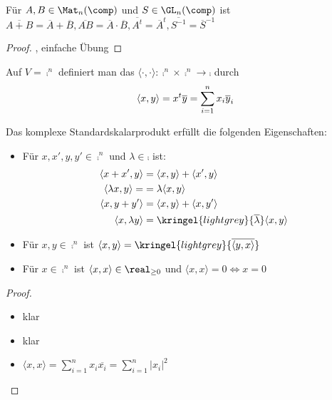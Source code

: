 \begin{conclusion}
	Für $A,B\in\Mat_n(\comp)$ und $S\in\GL_n(\comp)$ ist $\overline{A+B}=\overline{A}+\overline{B}, \overline{AB}=\overline{A}\cdot \overline{B},\overline{A^t}=\overline{A}^t, \overline{S^{-1}}=\overline{S}^{-1}$
\end{conclusion}
\begin{proof}
	, einfache Übung
\end{proof}

\begin{definition}
	Auf $V=\comp^n$ definiert man das  $\langle\cdot,\cdot\rangle:\comp^n\times\comp^n\to \comp$ durch
	\begin{align}
	\langle x,y\rangle=x^t\overline{y}=\sum_{i=1}^n x_i\overline{y}_i\notag
	\end{align}
\end{definition}

\begin{proposition}
	Das komplexe Standardskalarprodukt erfüllt die folgenden Eigenschaften:
	\begin{itemize}
		\item Für $x,x',y,y'\in\comp^n$ und $\lambda\in\comp$ ist:
		\begin{align}
		\langle x+x',y\rangle &= \langle x,y\rangle + \langle x',y\rangle\notag\\
		\langle \lambda x,y\rangle =&= \lambda \langle x,y \rangle\notag \\
		\langle x,y+y' \rangle &= \langle x,y \rangle + \langle x,y'\rangle\notag \\
		\langle x,\lambda y \rangle &= \kringel{lightgrey}{\overline{\lambda}} \langle x,y \rangle\notag
		\end{align}
		\item Für $x,y\in\comp^n$ ist $\langle x,y \rangle=\kringel{lightgrey}{\overline{\langle y,x\rangle}}$
		\item Für $x\in\comp^n$ ist $\langle x,x \rangle\in\real_{\ge 0}$ und $\langle x,x\rangle=0\iff x=0$
	\end{itemize}
\end{proposition}
\begin{proof}
	\begin{itemize}
		\item klar
		\item klar
		\item $\langle x,x\rangle=\sum_{i=1}^n x_i\overline{x_i}=\sum_{i=1}^n \vert x_i\vert^2$
	\end{itemize}
\end{proof}

